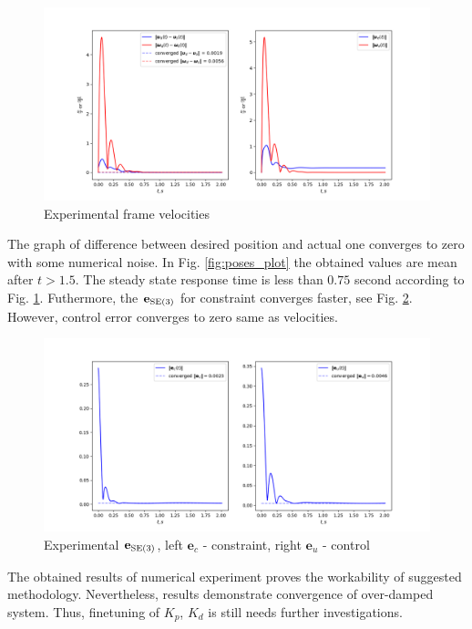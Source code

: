\begin{figure}[H]
    \centering
    \includegraphics[scale=0.52]{figs/vels_history.png}
    \caption{Experimental frame velocities}
    \label{fig:vels_plot}
\end{figure}

The graph of difference between desired position and actual one converges to 
zero with some numerical noise. In Fig. \ref{fig:poses_plot} the obtained 
values are mean after $t > 1.5$. The steady state response time is less 
than $0.75$ second according to Fig. \ref{fig:vels_plot}. Futhermore, 
the $\mathbf{e}_{\text{SE}(3)}$ for constraint converges faster, see  
Fig. \ref{fig:errors_plot}. However, control error converges to zero 
same as velocities.

\begin{figure}[H]
    \centering
    \includegraphics[scale=0.52]{figs/errors_history.png}
    \caption{Experimental $\mathbf{e}_{\text{SE}(3)}$, left $\mathbf{e}_c$ - constraint, 
    right $\mathbf{e}_u$ - control}
    \label{fig:errors_plot}
\end{figure}

The obtained results of numerical experiment proves the workability 
of suggested methodology. Nevertheless, results demonstrate convergence 
of over-damped system. Thus, finetuning of $K_p$, $K_d$ is still needs 
further investigations.
